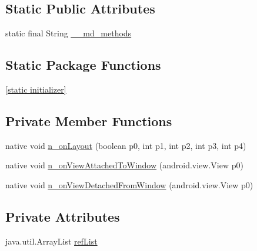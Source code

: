 \subsection*{Static Public Attributes}
\begin{CompactItemize}
\item 
static final String \hyperlink{classmd5b60ffeb829f638581ab2bb9b1a7f4f3f_1_1_button_renderer_9e989b257f85aa8a9f7b8ec7a324a423}{\_\-\_\-md\_\-methods}
\end{CompactItemize}
\subsection*{Static Package Functions}
\begin{CompactItemize}
\item 
\hyperlink{classmd5b60ffeb829f638581ab2bb9b1a7f4f3f_1_1_button_renderer_1a326f88f9ee0dcf3f66aa1ab755f41e}{\mbox{[}static initializer\mbox{]}}
\end{CompactItemize}
\subsection*{Private Member Functions}
\begin{CompactItemize}
\item 
native void \hyperlink{classmd5b60ffeb829f638581ab2bb9b1a7f4f3f_1_1_button_renderer_3d85bf7ad5f9368589a177164ef752bd}{n\_\-onLayout} (boolean p0, int p1, int p2, int p3, int p4)
\item 
native void \hyperlink{classmd5b60ffeb829f638581ab2bb9b1a7f4f3f_1_1_button_renderer_e11be655e3149b651da2d9352cea7df7}{n\_\-onViewAttachedToWindow} (android.view.View p0)
\item 
native void \hyperlink{classmd5b60ffeb829f638581ab2bb9b1a7f4f3f_1_1_button_renderer_702a0699c60f3404a3f34f8917d769a1}{n\_\-onViewDetachedFromWindow} (android.view.View p0)
\end{CompactItemize}
\subsection*{Private Attributes}
\begin{CompactItemize}
\item 
java.util.ArrayList \hyperlink{classmd5b60ffeb829f638581ab2bb9b1a7f4f3f_1_1_button_renderer_c9e5222d65858404501d5566e4a2de8a}{refList}
\end{CompactItemize}


